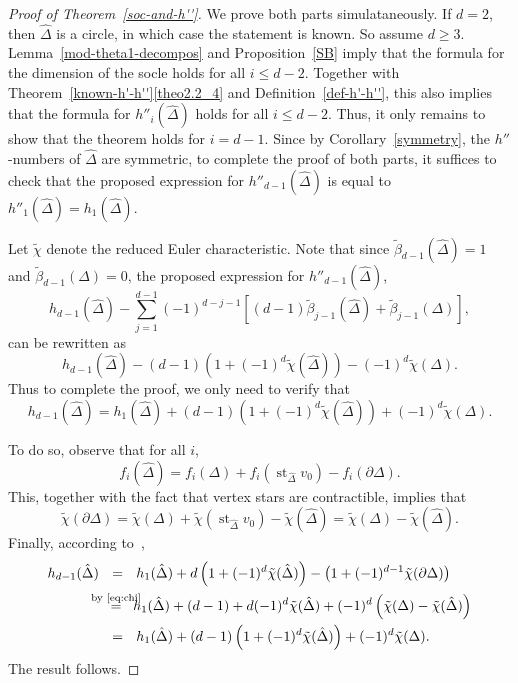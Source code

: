 \documentclass[ALCO,ThmDefs,Unicode,epreuves]{cedram}
\DeclareMathOperator\st{st}
\newcommand{\complet}[1]{\hat{#1}}
\begin{document}
\begin{proof}[Proof of Theorem~\ref{soc-and-h''}]
We prove both parts simulataneously. If $d=2$, then $\complet{\Delta}$ is a circle, in which case the statement is known. So assume $d\geq 3$. Lemma~\ref{mod-theta1-decompos} and Proposition~\ref{SB} imply that the formula for the dimension of the socle holds for all $i\leq d-2$. Together with Theorem~\ref{known-h'-h''}\eqref{theo2.2_4} and Definition~\ref{def-h'-h''}, this also implies that the formula for $h''_i(\complet{\Delta})$ holds for all $i\leq d-2$. Thus, it only remains to show that the theorem holds for $i=d-1$. Since by Corollary~\ref{symmetry}, the $h''$-numbers of $\complet{\Delta}$ are symmetric, to complete the proof of both parts, it suffices to check that the proposed expression for $h''_{d-1}(\complet{\Delta})$ is equal to $h''_1(\complet{\Delta})=h_1(\complet{\Delta})$.

Let $\tilde{\chi}$ denote the reduced Euler characteristic. Note that since $\tilde{\beta}_{d-1}(\complet{\Delta})=1$ and $\tilde{\beta}_{d-1}(\Delta)=0$, the proposed expression for $h''_{d-1}(\complet{\Delta})$, 
\[
h_{d-1}(\complet{\Delta})-\sum_{j=1}^{d-1}(-1)^{d-j-1}\left[(d-1)\tilde{\beta}_{j-1}(\complet{\Delta})+\tilde{\beta}_{j-1}(\Delta)\right],
\]
 can be rewritten as
\[
h_{d-1}(\complet{\Delta})- (d-1)\left(1+(-1)^d\tilde{\chi}(\complet{\Delta})\right)-(-1)^d\tilde{\chi}(\Delta).
\]
Thus to complete the proof, we only need to verify that 
\[
h_{d-1}(\complet{\Delta})=h_{1}(\complet{\Delta})+(d-1)\left(1+(-1)^d\tilde{\chi}(\complet{\Delta})\right)+(-1)^d\tilde{\chi}(\Delta).
\]

To do so, observe that for all $i$,
\[
f_i(\complet{\Delta})=f_i(\Delta)+f_i(\st_{\complet{\Delta}} v_0)- f_i(\partial\Delta).
\]
This, together with the fact that vertex stars are contractible, implies that
\begin{equation} \label{eq:chi}
\tilde{\chi}(\partial\Delta)=\tilde{\chi}(\Delta)+\tilde{\chi}(\st_{\complet{\Delta}} v_0)-\tilde{\chi}(\complet{\Delta})=
\tilde{\chi}(\Delta)-\tilde{\chi}(\complet{\Delta}).
\end{equation}
Finally, according to~\cite[Theorem~3.1]{Novik-Swartz-12},
\begin{align*}
 h_{d-1}(\complet{\Delta})&\ \ = \ \ h_{1}(\complet{\Delta})+d\left(1+(-1)^d\tilde{\chi}(\complet{\Delta})\right)-\left(1+(-1)^{d-1}\tilde{\chi}(\partial\Delta)\right)\\
& \ \ \mathop{=}^{\hbox to 0pt {\hss\scriptsize by~\eqref{eq:chi}\hss}} \ \ 
h_{1}(\complet{\Delta})+(d-1)+ d(-1)^d \tilde{\chi}(\complet{\Delta})+(-1)^d\left(\tilde{\chi}(\Delta)-\tilde{\chi}(\complet{\Delta})\right)\\
&\ \ = \ \ h_{1}(\complet{\Delta})+(d-1)\left(1+(-1)^d\tilde{\chi}(\complet{\Delta})\right)+(-1)^d\tilde{\chi}(\Delta).
\end{align*}
The result follows.
\end{proof}
\end{document}
